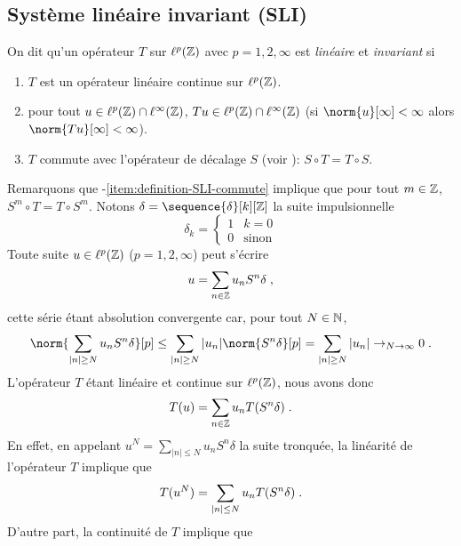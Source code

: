 \subsection{Système linéaire invariant  (SLI)}
\begin{definition}
\label{def:definition-SLI}
On dit qu'un opérateur $T$ sur $\ell^p(\mathbb{Z})$ avec $p=1,2,\infty$ est \emph{linéaire} et \emph{invariant} si
\begin{enumerate}[label=(\roman*)]
\item \label{item:definition-SLI-continu} $T$ est un opérateur linéaire continue sur $\ell^p(\mathbb{Z})$.
\item \label{item:defintion-SLI-borne} pour tout $u \in \ell^p(\mathbb{Z}) \cap \ell^\infty(\mathbb{Z})$,  $Tu \in \ell^p(\mathbb{Z}) \cap \ell^\infty(\mathbb{Z})$ (si $\norm{u}[\infty] < \infty$ alors $\norm{Tu}[\infty] < \infty$).
\item \label{item:definition-SLI-commute} $T$ commute avec l'opérateur de décalage $S$ (voir ): $S \circ T= T \circ S$.
\end{enumerate}
\end{definition}
Remarquons que -\ref{item:definition-SLI-commute} implique que pour tout $m \in \mathbb{Z}$, $S^m \circ T= T \circ S^m$.
Notons $\delta= \sequence{\delta}[k][\zset]$ la suite impulsionnelle
\begin{equation}
\label{eq:definition-impulsion}
\delta_k = \begin{cases} 1 & k = 0 \\ 0 & \text{sinon} \end{cases}
\end{equation}
Toute suite $u \in \ell^p(\mathbb{Z})$ ($p=1,2,\infty$) peut s'écrire
\begin{equation}
\label{eq:decomposition-u}
u = \sum_{n \in \mathbb{Z}} u_n S^n \delta \;,
\end{equation}
cette série étant absolution convergente car, pour tout $N \in \mathbb{N}$,
\[
\norm{\sum_{|n|\geq N} u_n S^n \delta}[p] \leq \sum_{|n|\geq N} |u_n| \norm{S^n \delta}[p] = \sum_{|n| \geq N} |u_n| \to_{N \to \infty} 0 \eqsp.
\]
L'opérateur $T$ étant linéaire et continue sur $\ell^p(\mathbb{Z})$, nous avons donc
\begin{equation}
\label{eq:action-operateur}
T(u)= \sum_{n \in \mathbb{Z}} u_n T(S^n \delta) \;.
\end{equation}
En effet, en appelant $u^N= \sum_{|n|\leq N} u_n S^n \delta$ la suite tronquée, la linéarité de l'opérateur $T$ implique que
\[
T(u^N)= \sum_{|n|\leq N} u_n T(S^n \delta) \;.
\]
D'autre part, la continuité de $T$ implique que
